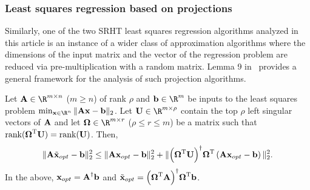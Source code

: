 \subsubsection{Least squares regression based on projections}

Similarly, one of the two SRHT least squares regression algorithms analyzed in this article is an instance of a wider class of approximation algorithms
where the dimensions of the input matrix and the vector of the regression problem are reduced via pre-multiplication with a random matrix.
Lemma 9 in~\cite{BDM12} provides a general framework for the analysis of such projection algorithms.
\begin{lemma} \label{prop3}
Let $\matA \in \R^{m \times n}$ ($m \ge n$) of rank $\rho$ and $\b \in \R^m$ be inputs to the least squares problem $\min_{\x \in \R^n}\TNorm{\matA \x -\b}$.
Let $\matU \in \R^{m \times \rho}$ contain the top $\rho$ left singular vectors of ${\bm{\mathrm{A}}}$ and let $\matOmega \in \R^{m \times r}$ ($\rho \le r \le m $) be a matrix
such that $\hbox{\rm rank}({\bm{\mathrm{\Omega}}}^{\textsc{T}} {\bm{\mathrm{U}}}) = \hbox{\rm rank}({\bm{\mathrm{U}}})$. Then,
$$ \mbox{}\| {\bm{\mathrm{A}}} \tilde{{\mathbf x}}_{opt} - {\mathbf b}  \|_2^2 \le \mbox{}\| {\bm{\mathrm{A}}} {\mathbf x}_{opt} - {\mathbf b}  \|_2^2 + \mbox{}\| { \left( {\bm{\mathrm{\Omega}}}^{\textsc{T}} {\bm{\mathrm{U}}} \right) }^\dagger {\ensuremath{\bm{\mathrm{\Omega}}}}^{\textsc{T}}  \left({\bm{\mathrm{A}}} {\mathbf x}_{opt} - {\mathbf b}\right)  \|_2^2.  $$
In the above, ${\mathbf x}_{opt} = {{\bm{\mathrm{A}}}}^\dagger {\mathbf b}$ and $\tilde{{\mathbf x}}_{opt} = { \left( {\bm{\mathrm{\Omega}}}^{\textsc{T}} {\bm{\mathrm{A}}} \right) }^\dagger {\ensuremath{\bm{\mathrm{\Omega}}}}^{\textsc{T}} {\mathbf b}$.
\end{lemma}

